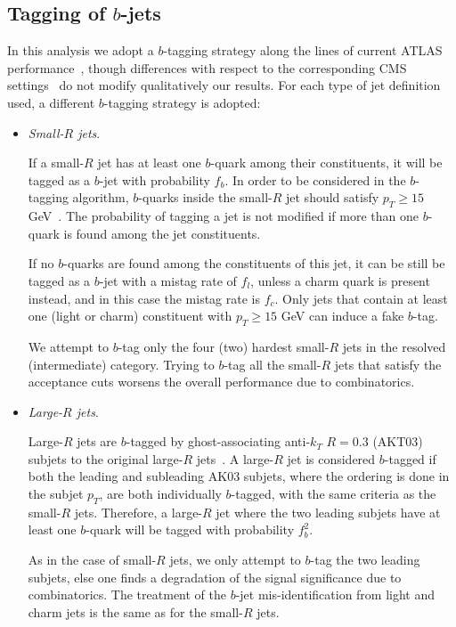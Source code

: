 \subsection{Tagging of $b$-jets}
\label{sec:btagging}

In this analysis we adopt
a $b$-tagging strategy along the lines
of current ATLAS performance~\cite{Aad:2013gja,Aad:2015ydr},
though differences with respect to
the corresponding CMS
settings~\cite{Khachatryan:2011wq,Chatrchyan:2012jua}
do not modify qualitatively our results.
%
For each type of jet definition used, a different
$b$-tagging strategy is adopted:

\begin{itemize}

\item {\it Small-$R$ jets}.

  If a small-$R$ jet has at least one $b$-quark among their constituents,
  it will be tagged as a $b$-jet with probability $f_b$.
  In order to be considered in the $b$-tagging algorithm,
  $b$-quarks inside the small-$R$ jet
  should satisfy $p_T \ge 15$ GeV~\cite{Aad:2015ydr}.
  The probability of tagging a jet is not modified
  if more than one $b$-quark is found among the jet constituents.


  
  If no $b$-quarks are found among the constituents
  of this jet, it can be still be tagged as a $b$-jet with
  a mistag rate of $f_l$, unless a charm quark is present instead,
  and in this case the mistag rate is $f_c$.
  Only jets that contain at least one (light or charm)
  constituent
  with $p_T \ge 15$ GeV can induce a fake $b$-tag.

  
  We attempt to $b$-tag only the four (two) hardest small-$R$ jets
  in the resolved (intermediate) category.
  Trying to $b$-tag all the
  small-$R$ jets that satisfy the acceptance cuts worsens the
  overall performance
  due to combinatorics.

  \item {\it Large-$R$ jets}.

    Large-$R$ jets are $b$-tagged by
    ghost-associating anti-$k_T$ $R=0.3$ (AKT03)
    subjets to the original large-$R$
    jets~\cite{Cacciari:2007fd,Aad:2013gja,
      ATLAS-CONF-2014-004,Aad:2015uka}.
    A large-$R$ jet is considered $b$-tagged if both
    the leading and subleading AK03 subjets, where the ordering
    is done in the subjet $p_T$, are both individually $b$-tagged,
    with the same criteria as the small-$R$ jets.
     Therefore, a large-$R$ jet where the two leading
    subjets have at least one $b$-quark will be tagged
    with probability $f_b^2$.
    
    As in the case
    of small-$R$ jets, we only attempt to $b$-tag the two leading subjets,
    else one finds a degradation of the
    signal significance due to combinatorics.
    The treatment of the $b$-jet mis-identification
    from light and charm jets
    is the same as for the small-$R$ jets.
  
\end{itemize}

